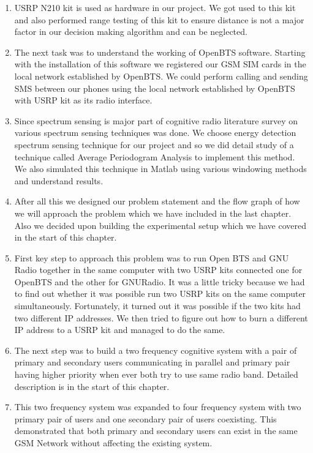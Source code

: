 \begin{enumerate}
\item USRP N210 kit is used as hardware in our project. We got used to this kit and 
also performed range testing of this kit to ensure distance is not a major factor in 
our decision making algorithm and can be neglected.
\item The next task was to understand the working of OpenBTS software. Starting 
with the installation of this software we registered our GSM SIM cards in the 
local network established by OpenBTS. We could perform calling and sending SMS
between our phones using the local network established by OpenBTS with USRP 
kit as its radio interface.
\item Since spectrum sensing is major part of cognitive radio literature survey 
on various spectrum sensing techniques was done. We choose energy detection 
spectrum sensing technique for our project and so we did detail study of a 
technique called Average Periodogram Analysis to implement this method. We also 
simulated this technique in Matlab using various windowing methods and 
understand results. 
\item After all this we designed our problem statement and the flow graph of 
how we will approach the problem which we have included in the last chapter. 
Also we decided upon building the experimental setup which we have covered in 
the start of this chapter. 
\item  First key step to approach this problem was to run Open BTS and GNU 
Radio together in the same computer with two USRP kits connected one for 
OpenBTS and the other for GNURadio. It was a little tricky because we had to
find out whether it was possible run two USRP kits on the same computer simultaneously.
Fortunately, it turned out it was possible if the two kits had two different IP addresses.
We then tried to figure out how to burn a different IP address to a USRP kit and
managed to do the same.
\item The next step was to build a two frequency cognitive system with a pair of 
primary and secondary users communicating in parallel and primary pair having 
higher priority when ever both try to use same radio band. Detailed description 
is in the start of this chapter.
\item This two frequency system was expanded to four frequency system with two 
primary pair of users and one secondary pair of users coexisting. This 
demonstrated that both primary and secondary users can exist in the same GSM 
Network without affecting the existing system.
\end{enumerate}